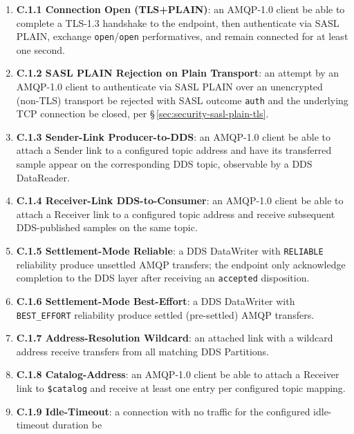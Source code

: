 \documentclass{../styles/zerodds-vendor-spec}
\begin{document}
\begin{enumerate}
  \item \textbf{C.1.1 Connection Open (TLS+PLAIN)}: an AMQP-1.0
        client  be able to complete a TLS-1.3
        handshake to the endpoint, then authenticate via SASL
        PLAIN, exchange \texttt{open}/\texttt{open} performatives,
        and remain connected for at least one second.
  \item \textbf{C.1.2 SASL PLAIN Rejection on Plain Transport}:
        an attempt by an AMQP-1.0 client to authenticate via
        SASL PLAIN over an unencrypted (non-TLS) transport
         be rejected with SASL outcome \texttt{auth}
        and the underlying TCP connection  be closed,
        per \S\,\ref{sec:security-sasl-plain-tls}.
  \item \textbf{C.1.3 Sender-Link Producer-to-DDS}: an
        AMQP-1.0 client  be able to attach a Sender
        link to a configured topic address and have its transferred
        sample appear on the corresponding DDS topic, observable by
        a DDS DataReader.
  \item \textbf{C.1.4 Receiver-Link DDS-to-Consumer}: an AMQP-1.0
        client  be able to attach a Receiver link to
        a configured topic address and receive subsequent
        DDS-published samples on the same topic.
  \item \textbf{C.1.5 Settlement-Mode Reliable}: a DDS DataWriter
        with \texttt{RELIABLE} reliability  produce
        unsettled AMQP transfers; the endpoint 
        only acknowledge completion to the DDS layer after
        receiving an \texttt{accepted} disposition.
  \item \textbf{C.1.6 Settlement-Mode Best-Effort}: a DDS
        DataWriter with \texttt{BEST\_EFFORT} reliability
         produce settled (pre-settled) AMQP transfers.
  \item \textbf{C.1.7 Address-Resolution Wildcard}: an
        attached link with a wildcard address 
        receive transfers from all matching DDS Partitions.
  \item \textbf{C.1.8 Catalog-Address}: an AMQP-1.0 client
         be able to attach a Receiver link to
        \texttt{\$catalog} and receive at least one entry per
        configured topic mapping.
  \item \textbf{C.1.9 Idle-Timeout}: a connection with no traffic
        for the configured idle-timeout duration  be

\end{enumerate}
\end{document}
